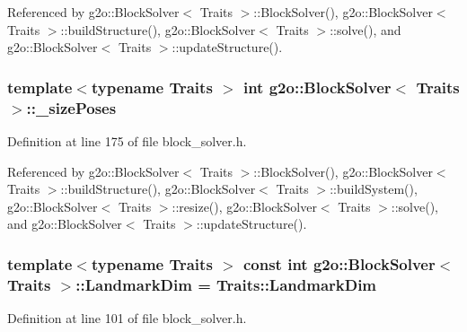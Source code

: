 Referenced by g2o\+::\+Block\+Solver$<$ Traits $>$\+::\+Block\+Solver(), g2o\+::\+Block\+Solver$<$ Traits $>$\+::build\+Structure(), g2o\+::\+Block\+Solver$<$ Traits $>$\+::solve(), and g2o\+::\+Block\+Solver$<$ Traits $>$\+::update\+Structure().

\subsubsection[{\texorpdfstring{\+\_\+size\+Poses}{_sizePoses}}]{\setlength{\rightskip}{0pt plus 5cm}template$<$typename Traits $>$ int {\bf g2o\+::\+Block\+Solver}$<$ Traits $>$\+::\+\_\+size\+Poses\hspace{0.3cm}{\ttfamily [protected]}}\hypertarget{classg2o_1_1BlockSolver_a39ec000379885ce09cdd8c23ab6d4567}{}\label{classg2o_1_1BlockSolver_a39ec000379885ce09cdd8c23ab6d4567}


Definition at line 175 of file block\+\_\+solver.\+h.



Referenced by g2o\+::\+Block\+Solver$<$ Traits $>$\+::\+Block\+Solver(), g2o\+::\+Block\+Solver$<$ Traits $>$\+::build\+Structure(), g2o\+::\+Block\+Solver$<$ Traits $>$\+::build\+System(), g2o\+::\+Block\+Solver$<$ Traits $>$\+::resize(), g2o\+::\+Block\+Solver$<$ Traits $>$\+::solve(), and g2o\+::\+Block\+Solver$<$ Traits $>$\+::update\+Structure().

\subsubsection[{\texorpdfstring{Landmark\+Dim}{LandmarkDim}}]{\setlength{\rightskip}{0pt plus 5cm}template$<$typename Traits $>$ const int {\bf g2o\+::\+Block\+Solver}$<$ Traits $>$\+::Landmark\+Dim = Traits\+::\+Landmark\+Dim\hspace{0.3cm}{\ttfamily [static]}}\hypertarget{classg2o_1_1BlockSolver_a2d5e499f65a71985a8256e98c1608dd9}{}\label{classg2o_1_1BlockSolver_a2d5e499f65a71985a8256e98c1608dd9}


Definition at line 101 of file block\+\_\+solver.\+h.

